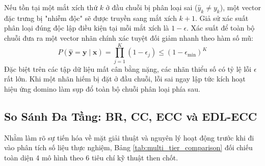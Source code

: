 \documentclass[1p,times]{elsarticle}
\begin{document}
Nếu tồn tại một mắt xích thứ $k$ ở đầu chuỗi bị phân loại sai ($\hat{y}_k \neq y_k$), một vector đặc trưng bị "nhiễm độc" sẽ được truyền sang mắt xích $k+1$. Giả sử xác suất phân loại đúng độc lập điều kiện tại mỗi mắt xích là $1 - \epsilon$. Xác suất để toàn bộ chuỗi đưa ra một vector nhãn chính xác tuyệt đối giảm nhanh theo hàm số mũ:
\begin{equation}
    P(\hat{\mathbf{y}} = \mathbf{y} \mid \mathbf{x}) = \prod_{j=1}^K (1 - \epsilon_j) \le (1 - \epsilon_{\min})^K
\end{equation}
Đặc biệt trên các tập dữ liệu mất cân bằng nặng, các nhãn thiểu số có tỷ lệ lỗi $\epsilon$ rất lớn. Khi một nhãn hiếm bị đặt ở đầu chuỗi, lỗi sai ngay lập tức kích hoạt hiệu ứng domino làm sụp đổ toàn bộ chuỗi phân loại phía sau.

\subsection{So Sánh Đa Tầng: BR, CC, ECC và EDL-ECC}
Nhằm làm rõ sự tiến hóa về mặt giải thuật và nguyên lý hoạt động trước khi đi vào phân tích số liệu thực nghiệm, Bảng \ref{tab:multi_tier_comparison} đối chiếu toàn diện 4 mô hình theo 6 tiêu chí kỹ thuật then chốt.
\end{document}
